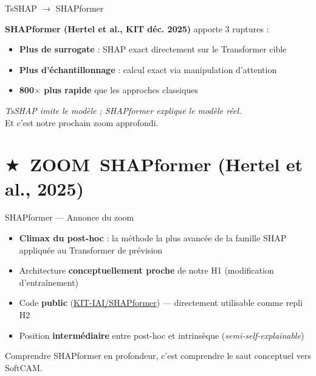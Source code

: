 \documentclass[10pt]{beamer}
\newcommand{\zoomtag}{\textcolor{newcontrib}{\textbf{\large \ensuremath{\bigstar}\ ZOOM}}}
\begin{document}
\begin{frame}{TsSHAP $\to$ SHAPformer}
  \begin{plusbox}
    \textbf{SHAPformer (Hertel et al., KIT déc. 2025)} apporte 3 ruptures :
    \begin{itemize}
      \item \textbf{Plus de surrogate} : SHAP exact directement sur le Transformer cible
      \item \textbf{Plus d'échantillonnage} : calcul exact via manipulation d'attention
      \item \textbf{800$\times$ plus rapide} que les approches classiques
    \end{itemize}
    \vspace{2pt}\centering
    \emph{TsSHAP imite le modèle ; SHAPformer explique le modèle réel.}\\
    Et c'est notre prochain zoom approfondi.
  \end{plusbox}
\end{frame}

\section{\zoomtag\ SHAPformer (Hertel et al., 2025)}

\begin{frame}{SHAPformer — Annonce du zoom}
  \begin{tcolorbox}[colback=newcontrib!5, colframe=newcontrib!70!black, arc=3mm,
                    fonttitle=\bfseries, title=Pourquoi un zoom approfondi sur SHAPformer ?]
    \begin{itemize}
      \item \textbf{Climax du post-hoc} : la méthode la plus avancée de la famille SHAP appliquée au Transformer de prévision
      \item Architecture \textbf{conceptuellement proche} de notre H1 (modification d'entraînement)
      \item Code \textbf{public} (\href{https://github.com/KIT-IAI/SHAPformer}{KIT-IAI/SHAPformer}) — directement utilisable comme repli H2
      \item Position \textbf{intermédiaire} entre post-hoc et intrinsèque (\emph{semi-self-explainable})
    \end{itemize}
    \vspace{4pt}\centering
    Comprendre SHAPformer en profondeur, c'est comprendre le saut conceptuel vers SoftCAM.
  \end{tcolorbox}
\end{frame}
\end{document}
